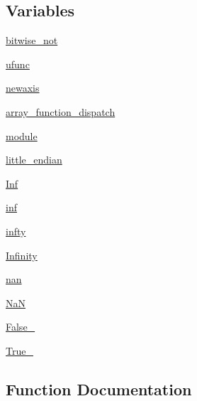 \subsection*{Variables}
\begin{DoxyCompactItemize}
\item 
\hyperlink{namespacenumpy_1_1core_1_1numeric_ae37e6ffc5c512f8f779f5f80e0b5b125}{bitwise\+\_\+not}
\item 
\hyperlink{namespacenumpy_1_1core_1_1numeric_a6849667f3ff1fc8e6744d78ddb9bb255}{ufunc}
\item 
\hyperlink{namespacenumpy_1_1core_1_1numeric_a12131451d407734cb2ada6ed24a5cb37}{newaxis}
\item 
\hyperlink{namespacenumpy_1_1core_1_1numeric_a1698b6cbb64f3efa755817bb901bd671}{array\+\_\+function\+\_\+dispatch}
\item 
\hyperlink{namespacenumpy_1_1core_1_1numeric_ac75d59d42115842ec94bddfcea9eb55e}{module}
\item 
\hyperlink{namespacenumpy_1_1core_1_1numeric_a9adade5a81e5fd356066c0a15efab7e1}{little\+\_\+endian}
\item 
\hyperlink{namespacenumpy_1_1core_1_1numeric_af6ceaed7c0d5510027ba55035b6fa22d}{Inf}
\item 
\hyperlink{namespacenumpy_1_1core_1_1numeric_a66178886e0a5addcb6bdc1c40a86093d}{inf}
\item 
\hyperlink{namespacenumpy_1_1core_1_1numeric_ab32a6f5640d70cf737e66258373686ff}{infty}
\item 
\hyperlink{namespacenumpy_1_1core_1_1numeric_aaaf0e999614f2c21f60df98b46dfe3bb}{Infinity}
\item 
\hyperlink{namespacenumpy_1_1core_1_1numeric_a4b68747d149cd435f8a72a27a3064423}{nan}
\item 
\hyperlink{namespacenumpy_1_1core_1_1numeric_aa88f5603f133be779d23143fa29a34ac}{NaN}
\item 
\hyperlink{namespacenumpy_1_1core_1_1numeric_a8551e415af62ce8b4ef665319c6f1b9a}{False\+\_\+}
\item 
\hyperlink{namespacenumpy_1_1core_1_1numeric_aa00a75e1a5aaf8d6ffbd085dbe0c848e}{True\+\_\+}
\end{DoxyCompactItemize}


\subsection{Function Documentation}
\mbox{\label{namespacenumpy_1_1core_1_1numeric_ad595579ad95d35c8e9b43080cbbe2d19}} 
